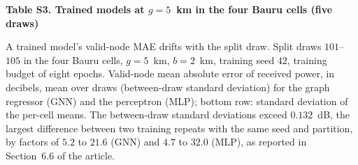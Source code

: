 \documentclass[10pt,a4paper]{article}
\newcommand{\tabajusta}[1]{\sbox{\tabcaixa}{#1}\ifdim\wd\tabcaixa>\linewidth\resizebox{\linewidth}{!}{\usebox{\tabcaixa}}\else\usebox{\tabcaixa}\fi}
\begin{document}
{\large\bfseries Table S3. Trained models at $g = 5$~km in the four Bauru cells (five draws)}

\medskip
\small
A trained model's valid-node MAE drifts with the split draw. Split draws $101$--$105$ in the four Bauru cells, $g = 5$~km, $b = 2$~km, training seed $42$, training budget of eight epochs. Valid-node mean absolute error of received power, in decibels, mean over draws (between-draw standard deviation) for the graph regressor (GNN) and the perceptron (MLP); bottom row: standard deviation of the per-cell means. The between-draw standard deviations exceed $0.132$~dB, the largest difference between two training repeats with the same seed and partition, by factors of $5.2$ to $21.6$ (GNN) and $4.7$ to $32.0$ (MLP), as reported in Section~6.6 of the article.

\medskip
\centering
\tabajusta{}
\end{document}
